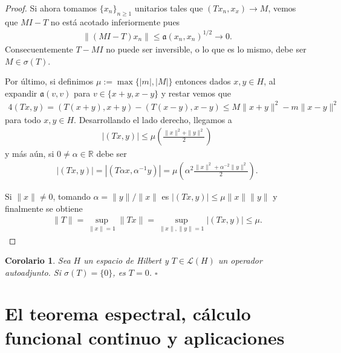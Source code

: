 \documentclass[11pt]{report}
\theoremstyle{colored}
\newtheorem{corollary}{Corolario}[section]
\newcommand{\R}{\mathbb{R}}
\newcommand{\ip}[1]{( #1 )}
\begin{document}
\begin{proof}
Si ahora tomamos $\{x_n\}_{n \geq 1}$ unitarios tales que $\ip{Tx_n,x_x} \to M$, vemos que $MI-T$ no está acotado inferiormente pues
\begin{align*}
\|(M I -T )x_n\| \leq \mathfrak{a}(x_n,x_n)^{1/2} \to 0.
\end{align*}
Consecuentemente $T-M I$ no puede ser inversible, o lo que es lo mismo, debe ser $M \in \sigma(T)$.

Por último, si definimos $\mu := \max\{|m|,|M|\}$ entonces dados $x,y \in H$, al expandir $\mathfrak{a}(v,v)$ para $v \in \{x+y,x-y\}$ y restar vemos que
\begin{align*}
4\ip{Tx,y}  = \ip{T(x+y),x+y}-\ip{T(x-y),x-y} \leq M\|x+y\|^2 - m\|x-y\|^2
\end{align*}
para todo $x,y \in H$. Desarrollando el lado derecho, llegamos a 
\begin{align*}
|\ip{Tx,y}| \leq \mu \left(\frac{\|x\|^2 + \|y\|^2}{2}\right)
\end{align*}
y más aún, si $0 \neq \alpha \in \R$ debe ser
\begin{align*}
|\ip{Tx,y}| = |\ip{T\alpha x, \alpha^{-1}y}| = \mu \left(\alpha^2\frac{\|x\|^2 + \alpha^{-2}\|y\|^2}{2}\right).
\end{align*}

Si $\|x\| \neq 0$, tomando $\alpha = \|y\|/\|x\|$ es $|\ip{Tx,y}| \leq \mu \|x\|\|y\|$ y finalmente se obtiene
\begin{align*}
\|T\| = \sup_{\|x\| = 1}\|Tx\| = \sup_{\|x\|,\|y\| = 1} |(Tx,y)| \leq \mu.
\end{align*}
\end{proof}

\begin{corollary} Sea $H$ un espacio de Hilbert y $T \in \mathscr{L}(H)$ un operador autoadjunto. Si $\sigma(T) = \{0\}$, es $T = 0$. $\square$
\end{corollary}

\chapter{El teorema espectral, cálculo funcional continuo y aplicaciones}
\end{document}
